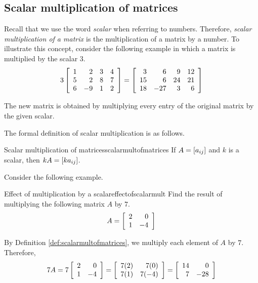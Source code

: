 \subsection{Scalar multiplication of matrices}

Recall that we use the word {\em scalar \em}when referring to numbers. Therefore, {\em scalar multiplication of a matrix \em}is the multiplication of a matrix by a number.  
To illustrate this concept, consider the following example in which a
matrix is multiplied by the scalar $3$.
\begin{equation*}
3\left[
\begin{array}{rrrr}
1 & 2 & 3 & 4 \\
5 & 2 & 8 & 7 \\
6 & -9 & 1 & 2
\end{array}
\right] = \left[
\begin{array}{rrrr}
3 & 6 & 9 & 12 \\
15 & 6 & 24 & 21 \\
18 & -27 & 3 & 6
\end{array}
\right] 
\end{equation*}

The new matrix is obtained by multiplying every entry of the original matrix
by the given scalar. 

The formal definition of scalar multiplication is as follows.

\begin{definition}{Scalar multiplication of matrices}{scalarmultofmatrices}
If $A=\left[ a_{ij}\right] $ and $k$ is a scalar,
then $kA=\left[ ka_{ij}\right]$.
\end{definition}

Consider the following example.

\begin{example}{Effect of multiplication by a scalar}{effectofscalarmult}
Find the result of multiplying the following matrix $A$ by $7$.
\begin{equation*}
A=\left[
\begin{array}{rr}
2 & 0 \\
1 & -4
\end{array}
\right]
\end{equation*}
\end{example}

\begin{solution}
By Definition \ref{def:scalarmultofmatrices}, we multiply each element of $A$ by $7$.
Therefore,
\begin{equation*}
7A = 
7\left[
\begin{array}{rr}
2 & 0 \\
1 & -4
\end{array}
\right] =
\left[
\begin{array}{rr}
7(2) & 7(0) \\
7(1) & 7(-4)
\end{array}
\right] =
\left[
\begin{array}{rr}
14 & 0 \\
7 & -28
\end{array}
\right]
\end{equation*}
\end{solution}

